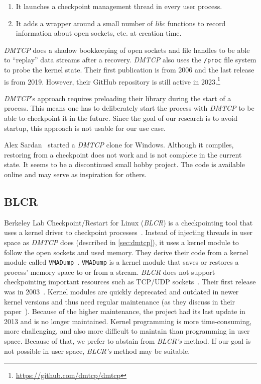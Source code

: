 \documentclass[a4paper, 11pt, english]{report}
\begin{document}
\begin{enumerate}
	\item It launches a checkpoint management thread in every user process.
	\item It adds a wrapper around a small number of \textit{libc} functions to record information about open sockets, etc. at creation time.
\end{enumerate}

\textit{DMTCP} does a shadow bookkeeping of open sockets and file handles to be able to ``replay'' data streams after a recovery. \textit{DMTCP} also uses the \texttt{/proc} file system to probe the kernel state. Their first publication is from 2006 and the last release is from 2019. However, their GitHub repository is still active in 2023.\footnote{\url{https://github.com/dmtcp/dmtcp}}

\textit{DMTCP}'s approach requires preloading their library during the start of a process. This means one has to deliberately start the process with \textit{DMTCP} to be able to checkpoint it in the future. Since the goal of our research is to avoid startup, this approach is not usable for our use case.

Alex Sardan~\cite{dmtcp-windows} started a \textit{DMTCP} clone for Windows. Although it compiles, restoring from a checkpoint does not work and is not complete in the current state. It seems to be a discontinued small hobby project. The code is available online and may serve as inspiration for others.

\subsection{BLCR}
\label{sec:blcr}
Berkeley Lab Checkpoint/Restart for Linux (\textit{BLCR}) is a checkpointing tool that uses a kernel driver to checkpoint processes~\cite{paul2006BLCR}. Instead of injecting threads in user space as \textit{DMTCP} does (described in \autoref{sec:dmtcp}), it uses a kernel module to follow the open sockets and used memory. They derive their code from a kernel module called \texttt{VMADump}~\cite{vmadump}. \texttt{VMADump} is a kernel module that saves or restores a process' memory space to or from a stream.
\textit{BLCR} does not support checkpointing important resources such as TCP/UDP sockets~\cite{paul2006BLCR}.
Their first release was in 2003~\cite{blcr}.
Kernel modules are quickly deprecated and outdated in newer kernel versions and thus need regular maintenance (as they discuss in their paper~\cite{paul2006BLCR}). Because of the higher maintenance, the project had its last update in 2013 and is no longer maintained.  
Kernel programming is more time-consuming, more challenging, and also more difficult to maintain than programming in user space. Because of that, we prefer to abstain from \textit{BLCR's} method.  
If our goal is not possible in user space, \textit{BLCR's} method may be suitable.
\end{document}
